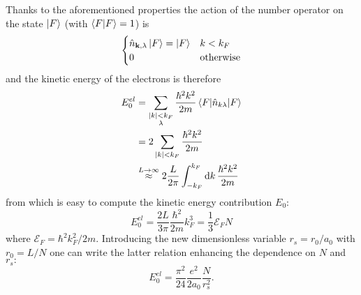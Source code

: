 \documentclass[a4paper]{article}
\begin{document}
Thanks to the aforementioned properties the action of the number operator on the state $\ket{F}$ (with $\braket{F} = 1$) is \begin{equation}\begin{cases} \hat{n}_{\vb{k},\lambda}\ket{F} = \ket{F}  &k<k_F \\ 0 &\text{otherwise} \end{cases}\end{equation} and the kinetic energy of the electrons is therefore
\begin{align}
E_0^{el}&=\sum_{\substack{\abs{k}<k_F\\\lambda}}\frac{\hbar^2k^2}{2m}\mel{F}{\hat{n}_{k\lambda}}{F}\\
&=2 \sum_{\abs{k}<k_F} \frac{\hbar^2k^2}{2m}\\
&\stackrel{L\rightarrow\infty}{\approx} 2 \frac{L}{2\pi}\int_{-k_F}^{k_F} \dd{k} \frac{\hbar^2k^2}{2m}\\
\end{align}
from which is easy to compute the kinetic energy contribution $E_0:$ \begin{equation} E_0^{el} = \frac{2L}{3\pi}\frac{\hbar^2}{2m}k_F^3 = \frac{1}{3}\mathcal{E}_F N \end{equation} where $\mathcal{E}_F = \hbar^2 k_F^2 / 2m.$
Introducing the new dimensionless variable $r_s = r_0/a_0$ with $r_0 = L/N$ one can write the latter relation enhancing the dependence on $N$ and $r_s:$ \begin{equation} E_0^{el} =   \frac{\pi^2}{24}\frac{e^2}{2 a_0} \frac{N}{r_s^2}. \end{equation}
\end{document}
